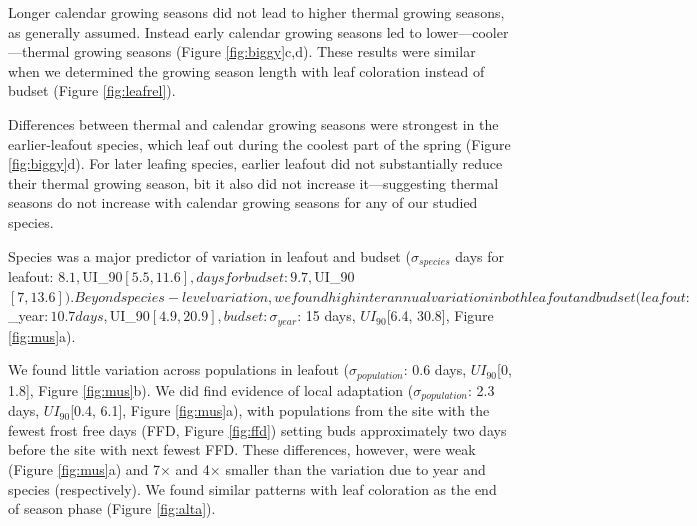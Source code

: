 \documentclass{article}[12pt]
\begin{document}
Longer calendar growing seasons did not lead to higher thermal growing seasons, as generally assumed. Instead
early calendar growing seasons led to lower---cooler---thermal growing seasons (Figure \ref{fig:biggy}c,d).  These results were similar when we determined the growing season length with leaf coloration instead of budset (Figure \ref{fig:leafrel}).

Differences between thermal and calendar growing seasons were strongest in the earlier-leafout species, which leaf out during the coolest part of the spring (Figure \ref{fig:biggy}d). %
 For later leafing species, earlier leafout did not substantially reduce their thermal growing season, bit it also did not increase it---suggesting thermal seasons do not increase with calendar growing seasons for any of our studied species. 
 
 Species was a major predictor of variation in leafout and budset %
($\sigma_{species}$ days for leafout: $8.1, $UI_{90}$ [5.5, 11.6], days for budset: 9.7, $UI_{90}$[7, 13.6]). %
Beyond species-level variation, we found high interannual variation in both leafout and budset %
(leafout: $\sigma_{year}$: 10.7 days, $UI_{90}$[4.9, 20.9],  budset: \sigma_{year}$: 15 days, $UI_{90}$[6.4, 30.8], Figure \ref{fig:mus}a).


We found little variation across populations in leafout ($\sigma_{population}$: 0.6 days, $UI_{90}$[0, 1.8], Figure \ref{fig:mus}b).%
 We did find evidence of local adaptation ($\sigma_{population}$: 2.3 days, $UI_{90}$[0.4, 6.1], Figure \ref{fig:mus}a), with populations from the site with the fewest frost free days (FFD, Figure \ref{fig:ffd}) setting buds approximately two days before the site with next fewest FFD. These differences, however, were weak (Figure \ref{fig:mus}a) and 7$\times$ and 4$\times$ smaller than the variation due to year and species (respectively). We found similar patterns with leaf coloration as the end of season phase (Figure \ref{fig:alta}). 
\end{document}
